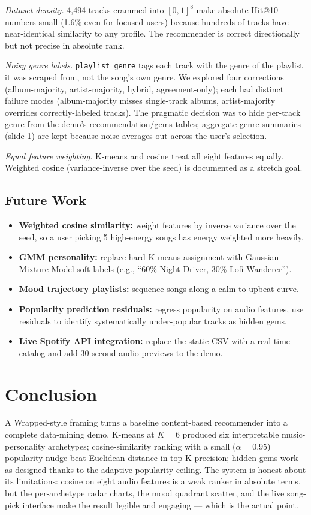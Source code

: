 \documentclass[letterpaper, 10 pt, conference]{ieeeconf}
\begin{document}
\textit{Dataset density.} 4{,}494 tracks crammed into $[0,1]^8$ make absolute Hit@10 numbers small (1.6\% even for focused users) because hundreds of tracks have near-identical similarity to any profile. The recommender is correct directionally but not precise in absolute rank.

\textit{Noisy genre labels.} \texttt{playlist\_genre} tags each track with the genre of the playlist it was scraped from, not the song's own genre. We explored four corrections (album-majority, artist-majority, hybrid, agreement-only); each had distinct failure modes (album-majority misses single-track albums, artist-majority overrides correctly-labeled tracks). The pragmatic decision was to hide per-track genre from the demo's recommendation/gems tables; aggregate genre summaries (slide 1) are kept because noise averages out across the user's selection.

\textit{Equal feature weighting.} K-means and cosine treat all eight features equally. Weighted cosine (variance-inverse over the seed) is documented as a stretch goal.

\subsection{Future Work}

\begin{itemize}
\item \textbf{Weighted cosine similarity:} weight features by inverse variance over the seed, so a user picking 5 high-energy songs has energy weighted more heavily.
\item \textbf{GMM personality:} replace hard K-means assignment with Gaussian Mixture Model soft labels (e.g., ``60\% Night Driver, 30\% Lofi Wanderer'').
\item \textbf{Mood trajectory playlists:} sequence songs along a calm-to-upbeat curve.
\item \textbf{Popularity prediction residuals:} regress popularity on audio features, use residuals to identify systematically under-popular tracks as hidden gems.
\item \textbf{Live Spotify API integration:} replace the static CSV with a real-time catalog and add 30-second audio previews to the demo.
\end{itemize}

\section{Conclusion}

A Wrapped-style framing turns a baseline content-based recommender into a complete data-mining demo. K-means at $K{=}6$ produced six interpretable music-personality archetypes; cosine-similarity ranking with a small ($\alpha{=}0.95$) popularity nudge beat Euclidean distance in top-K precision; hidden gems work as designed thanks to the adaptive popularity ceiling. The system is honest about its limitations: cosine on eight audio features is a weak ranker in absolute terms, but the per-archetype radar charts, the mood quadrant scatter, and the live song-pick interface make the result legible and engaging --- which is the actual point.



\end{document}
